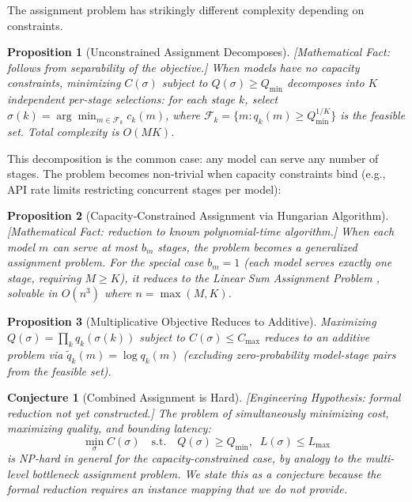 \documentclass[11pt, a4paper]{googledeepmind}
\newtheorem{proposition}{Proposition}[section]
\newtheorem{conjecture}{Conjecture}[section]
\begin{document}
The assignment problem has strikingly different complexity depending on constraints.

\begin{proposition}[Unconstrained Assignment Decomposes]
\emph{[Mathematical Fact: follows from separability of the objective.]}
\label{prop:routing-decompose}
When models have no capacity constraints, minimizing $C(\sigma)$ subject to $Q(\sigma) \geq Q_{\min}$ decomposes into $K$ independent per-stage selections: for each stage $k$, select $\sigma(k) = \arg\min_{m \in \mathcal{F}_k} c_k(m)$, where $\mathcal{F}_k = \{m : q_k(m) \geq Q_{\min}^{1/K}\}$ is the feasible set. Total complexity is $O(MK)$.
\end{proposition}

This decomposition is the common case: any model can serve any number of stages. The problem becomes non-trivial when capacity constraints bind (e.g., API rate limits restricting concurrent stages per model):

\begin{proposition}[Capacity-Constrained Assignment via Hungarian Algorithm]
\emph{[Mathematical Fact: reduction to known polynomial-time algorithm.]}
\label{prop:routing-hungarian}
When each model $m$ can serve at most $b_m$ stages, the problem becomes a generalized assignment problem. For the special case $b_m = 1$ (each model serves exactly one stage, requiring $M \geq K$), it reduces to the Linear Sum Assignment Problem \citep{kuhn1955, munkres1957}, solvable in $O(n^3)$ where $n = \max(M,K)$.
\end{proposition}

\begin{proposition}[Multiplicative Objective Reduces to Additive]
\label{prop:routing-multiplicative}
Maximizing $Q(\sigma) = \prod_k q_k(\sigma(k))$ subject to $C(\sigma) \leq C_{\max}$ reduces to an additive problem via $\tilde{q}_k(m) = \log q_k(m)$ (excluding zero-probability model-stage pairs from the feasible set).
\end{proposition}

\begin{conjecture}[Combined Assignment is Hard]
\emph{[Engineering Hypothesis: formal reduction not yet constructed.]}
\label{conj:routing-hard}
The problem of simultaneously minimizing cost, maximizing quality, and bounding latency:
\begin{equation}
\min_{\sigma} C(\sigma) \quad \text{s.t.} \quad Q(\sigma) \geq Q_{\min}, \;\; L(\sigma) \leq L_{\max}
\end{equation}
is NP-hard in general for the capacity-constrained case, by analogy to the multi-level bottleneck assignment problem. We state this as a conjecture because the formal reduction requires an instance mapping that we do not provide.
\end{conjecture}
\end{document}

